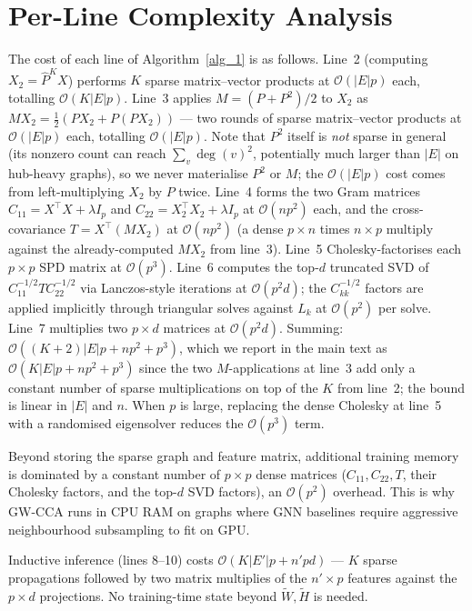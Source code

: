 \documentclass{article}
\begin{document}
\section{Per-Line Complexity Analysis}
\label{app:complexity}

The cost of each line of Algorithm~\ref{alg_1} is as follows.
Line~2 (computing $X_2 = \widehat{P}^K X$) performs $K$ sparse
matrix--vector products at $\mathcal{O}(|E| p)$ each, totalling
$\mathcal{O}(K |E| p)$.
Line~3 applies $M = (P + P^2)/2$ to $X_2$ as
$M X_2 = \tfrac{1}{2}(P X_2 + P(P X_2))$ --- two rounds of sparse
matrix--vector products at $\mathcal{O}(|E| p)$ each, totalling
$\mathcal{O}(|E| p)$. Note that $P^2$ itself is \emph{not} sparse in
general (its nonzero count can reach $\sum_v \deg(v)^2$, potentially
much larger than $|E|$ on hub-heavy graphs), so we never materialise
$P^2$ or $M$; the $\mathcal{O}(|E| p)$ cost comes from left-multiplying
$X_2$ by $P$ twice.
Line~4 forms the two Gram matrices $C_{11} = X^\top X + \lambda I_p$ and
$C_{22} = X_2^\top X_2 + \lambda I_p$ at $\mathcal{O}(n p^2)$ each, and
the cross-covariance $T = X^\top (M X_2)$ at $\mathcal{O}(n p^2)$ (a
dense $p \times n$ times $n \times p$ multiply against the already-computed
$M X_2$ from line~3).
Line~5 Cholesky-factorises each $p \times p$ SPD matrix at
$\mathcal{O}(p^3)$.
Line~6 computes the top-$d$ truncated SVD of $C_{11}^{-1/2} T C_{22}^{-1/2}$
via Lanczos-style iterations at $\mathcal{O}(p^2 d)$; the $C_{kk}^{-1/2}$
factors are applied implicitly through triangular solves against $L_k$ at
$\mathcal{O}(p^2)$ per solve.
Line~7 multiplies two $p \times d$ matrices at $\mathcal{O}(p^2 d)$.
Summing: $\mathcal{O}((K{+}2) |E| p + n p^2 + p^3)$, which we report in
the main text as $\mathcal{O}(K |E| p + n p^2 + p^3)$ since the two
$M$-applications at line~3 add only a constant number of sparse
multiplications on top of the $K$ from line~2; the bound is linear in
$|E|$ and $n$. When $p$ is large, replacing the dense Cholesky at
line~5 with a randomised eigensolver reduces the $\mathcal{O}(p^3)$
term.

Beyond storing the sparse graph and feature matrix, additional training
memory is dominated by a constant number of $p \times p$ dense matrices
($C_{11}, C_{22}, T$, their Cholesky factors, and the top-$d$ SVD
factors), an $\mathcal{O}(p^2)$ overhead. This is why GW-CCA runs in
CPU RAM on graphs where GNN baselines require aggressive neighbourhood
subsampling to fit on GPU.

Inductive inference (lines 8--10) costs $\mathcal{O}(K |E'| p + n' p d)$
--- $K$ sparse propagations followed by two matrix multiplies of the
$n' \times p$ features against the $p \times d$ projections. No
training-time state beyond $\widetilde{W}, \widetilde{H}$ is needed.
\end{document}
